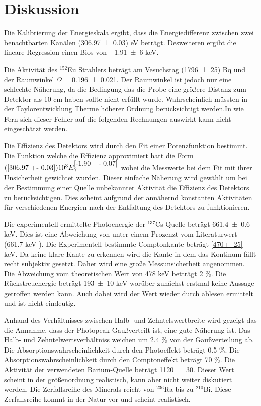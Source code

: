 \section{Diskussion}
\label{sec:Diskussion}
Die Kalibrierung der Energieskala ergibt, dass die Energiedifferenz zwischen zwei benachtbarten Kanälen (\num{306.97 +- 0.03}) eV beträgt. Desweiteren ergibt die lineare Regression einen Bios von \num{-1.91 +- 6} keV. 

Die Aktivität des $^{152}$Eu Strahlers beträgt am Vesuchstag (\num{1796 +- 25}) Bq und der Raumwinkel $\Omega$ = \num{0.196 +- 0.021}. Der Raumwinkel ist jedoch nur eine schlechte Näherung, da die Bedingung das die Probe eine größere Distanz zum Detektor als 10 cm haben sollte nicht erfüllt wurde. Wahrscheinlich müssten in der Taylorentwicklung Therme höherer Ordnung berücksichtigt werden.In wie Fern sich dieser Fehler auf die folgenden Rechnungen auswirkt kann nicht eingeschätzt werden.

Die Effizienz des Detektors wird durch den Fit einer Potenzfunktion bestimmt. Die Funktion welche die Effizienz approximiert hatt die Form $(\ref{306.97 +- 0.03})10^3 E_\gamma^{\ref{-1.90 +- 0.07}}$ wobei die Messwerte bei dem Fit mit ihrer Unsicherheit gewichtet wurden. Dieser einfache Näherung wird gewählt um bei der Bestimmung einer Quelle unbekannter Aktivität die Effizienz des Detektors zu berücksichtigen. Dies scheint aufgrund der annähernd konstanten Aktivitäten für verschiedenen Energien nach der Entfaltung des Detektors zu funktionieren.  

Die experimentell ermittelte Photoenergie der $^{137}$Cs-Quelle beträgt \num{661.4 +- 0.6} keV. Dies ist eine Abweichung von unter einem Prozenzt vom Literaturwert (661.7 keV \cite{Cs}). Die Experimentell bestimmte Comptonkante beträgt \ref{470+- 25} keV. Da keine klare Kante zu erkennen wird die Kante in dem das Kontinum fällt recht subjektiv gesetzt. Daher wird eine große Messunsicherheit angenommen. Die Abweichung vom theoretischen Wert von 478 keV betträgt 2 \%. Die Rückstreuenergie beträgt \num{193+- 10} keV worüber zunächst erstmal keine Aussage getroffen werden kann. Auch dabei wird der Wert wieder durch ablesen ermittelt und ist nicht eindeutig.  

Anhand des Verhältnisses zwischen Halb- und Zehntelswertbreite wird gezeigt das die Annahme, dass der Photopeak Gaußverteilt ist, eine gute Näherung ist. Das Halb- und Zehntelwertsverhältniss weichen um 2.4 \% von der Gaußverteilung ab. Die Absorptionswahrscheinlichkeit durch den Photoeffekt beträgt 0.5 \%. Die Absorptionswahrscheinlichkeit durch den Comptoneffekt beträgt 70 \%. Die Aktivität der verwendeten Barium-Quelle beträgt \num{1120 +- 30}. Dieser Wert scheint in der größenordnung realistisch, kann aber nicht weiter diskutiert werden. Die Zerfallsreihe des Minerals reicht von $^{236}$Ra bis zu $^{210}$Bi. Diese Zerfallsreihe kommt in der Natur vor und scheint realistisch.
